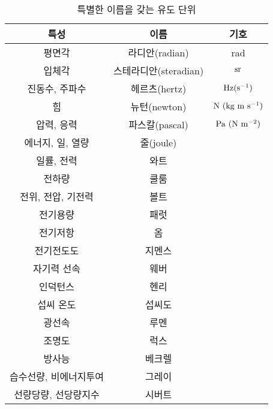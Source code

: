 \begin{table}[h]
	\centering
	\caption{특별한 이름을 갖는 유도 단위}
	\begin{tabular}{c|c|c}
		\hline 
특성	& 이름 & 기호 \\ 	\hline 
평면각	& 라디안(radian) & rad  \\ 	\hline 
입체각	& 스테라디안(steradian) & $\rm sr$ \\  \hline 
진동수, 주파수 & 헤르츠(hertz) & $\rm Hz(s^{-1})$  \\  \hline 
힘 & 뉴턴(newton) & $\rm N~(kg ~ m ~ s^{-1})$ \\  \hline 
압력, 응력 & 파스칼(pascal) & $\rm Pa~(N ~ m^{-2})$  \\  \hline 
에너지, 일, 열량 & 줄(joule) &   \\  \hline 
일률, 전력 & 와트 &  \\  \hline 
전하량 & 쿨룸 &  \\  \hline 
전위, 전압, 기전력 & 볼트 &  \\  \hline 
전기용량 & 패럿 &  \\  \hline 
전기저항& 옴 &  \\  \hline 
전기전도도 & 지멘스 &  \\  \hline 
자기력 선속 & 웨버&  \\  \hline 
인덕턴스 & 헨리 &  \\  \hline 
섭씨 온도 & 섭씨도 &  \\  \hline 
광선속& 루멘 &  \\  \hline 
조명도& 럭스 &  \\  \hline 
방사능 & 베크렐 &  \\  \hline 
습수선량, 비에너지투여 & 그레이 &  \\  \hline 
선량당량, 선당량지수 & 시버트 &  \\  \hline 
	\end{tabular} 
	\label{table:unit02}
\end{table}
